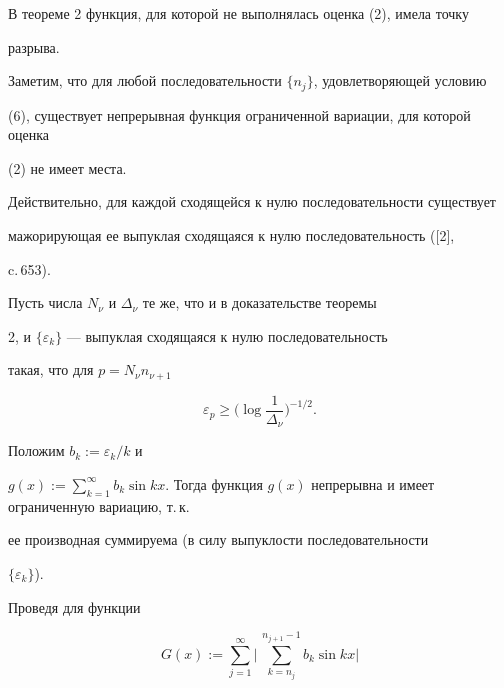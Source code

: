 






В теореме 2 функция, для которой не выполнялась оценка (2), имела точку


разрыва.





Заметим, что для любой последовательности $\{ n_j \}$, удовлетворяющей условию


(6), существует непрерывная функция ограниченной вариации, для которой оценка


(2) не имеет места.





Действительно, для каждой сходящейся к нулю последовательности существует


мажорирующая ее выпуклая сходящаяся к нулю последовательность ([2],


c.\,653).





Пусть числа $N_{\nu}$ и $\Delta_{\nu}$ те же, что и в доказательстве теоремы


2, и $\{ \varepsilon_k \}$ --- выпуклая сходящаяся к нулю последовательность


такая, что для $p = N_{\nu} n_{\nu + 1}$


$$


\varepsilon_p \ge \Bigg ( \log \frac{1}{\Delta_{\nu}} \Bigg )^{- 1 / 2}.


$$


Положим $b_k := \varepsilon_k / k$  и


$g(x) := \sum\limits_{k = 1}^{\infty} b_k \sin


kx$. Тогда функция $g(x)$ непрерывна и имеет ограниченную вариацию, т.\,к.


ее производная суммируема (в силу выпуклости последовательности


$\{ \varepsilon_k \}$).





Проведя для функции


$$


G(x) := \sum_{j = 1}^{\infty} \bigg | \, \sum_{k = n_j}^{n_{j + 1} - 1}


b_k \sin kx \bigg |


$$


